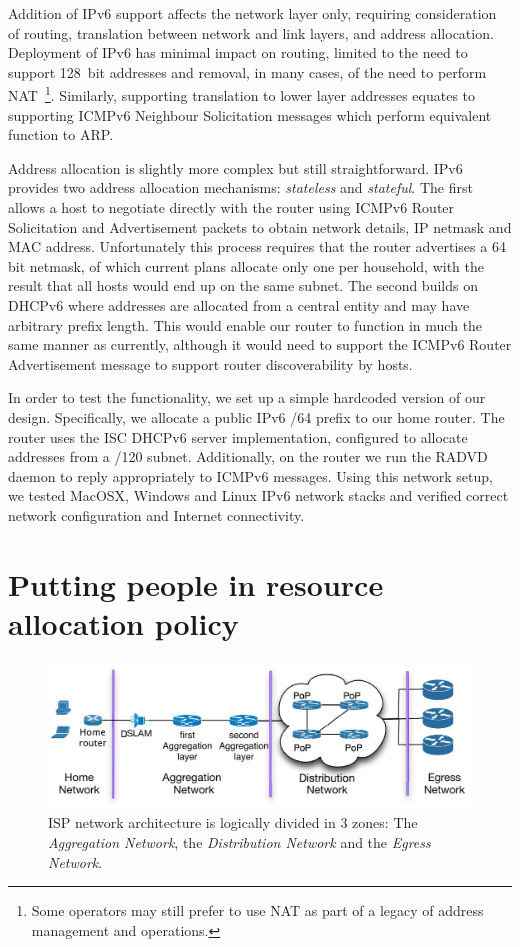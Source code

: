 Addition of IPv6 support affects the network layer only, requiring consideration
of routing, translation between network and link layers, and address
allocation.  Deployment of IPv6 has minimal impact on routing, limited to the
need to support 128~bit addresses and removal, in many cases, of the need to
perform NAT~\footnote{Some operators may still prefer to use NAT as part of a
  legacy of address management and operations.}.  Similarly, supporting
translation to lower layer addresses equates to supporting ICMPv6 Neighbour
Solicitation messages which perform equivalent function to ARP.

Address allocation is slightly more complex but still straightforward.  IPv6
provides two address allocation mechanisms: \emph{stateless} and
\emph{stateful}.  The first allows a host to negotiate directly with the router
using ICMPv6 Router Solicitation and Advertisement packets to obtain network
details, IP netmask and MAC address.  Unfortunately this process requires that
the router advertises a 64 bit netmask, of which current plans allocate only one
per household, with the result that all hosts would end up on the same subnet.
The second builds on DHCPv6 where addresses are allocated from a central entity
and may have arbitrary prefix length.  This would enable our router to function
in much the same manner as currently, although it would need to support the
ICMPv6 Router Advertisement message to support router discoverability by hosts. 

In order to test the functionality, we set up a simple hardcoded version of our
design. Specifically, we allocate a public IPv6 /64 prefix to our home router.
The router uses the ISC DHCPv6 server implementation, configured to allocate
addresses from a /120 subnet.  Additionally, on the router we run the RADVD
daemon to reply appropriately to ICMPv6 messages.  Using this network setup, we
tested MacOSX, Windows and Linux IPv6 network stacks and verified correct network
configuration and Internet connectivity. 


\section{Putting people in resource allocation policy} \label{s:qos}

\begin{figure}
  \centering
  \includegraphics[width=0.95\columnwidth]{isp_plan}
  \caption[ISP network architecture]{\label{fig:isp_plan} ISP network architecture is logically divided in 3
    zones: The {\it Aggregation Network}, the {\it Distribution Network}\/ and
    the {\it Egress Network}.}
\end{figure}

